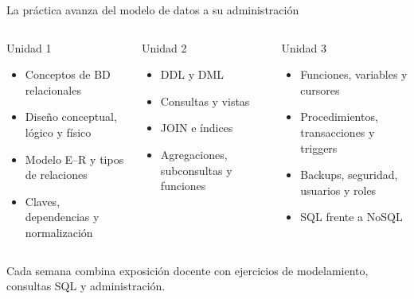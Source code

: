 \documentclass[aspectratio=169,10pt,c]{beamer}
\begin{document}
\begin{frame}{La práctica avanza del modelo de datos a su administración}
\begin{columns}[T,onlytextwidth]
\begin{block}{Unidad 1}
\footnotesize
\begin{itemize}\setlength\itemsep{2pt}
  \item Conceptos de BD relacionales
  \item Diseño conceptual, lógico y físico
  \item Modelo E--R y tipos de relaciones
  \item Claves, dependencias y normalización
\end{itemize}
\end{block}
\begin{exampleblock}{Unidad 2}
\footnotesize
\begin{itemize}\setlength\itemsep{2pt}
  \item DDL y DML
  \item Consultas y vistas
  \item JOIN e índices
  \item Agregaciones, subconsultas y funciones
\end{itemize}
\end{exampleblock}
\begin{alertblock}{Unidad 3}
\footnotesize
\begin{itemize}\setlength\itemsep{2pt}
  \item Funciones, variables y cursores
  \item Procedimientos, transacciones y triggers
  \item Backups, seguridad, usuarios y roles
  \item SQL frente a NoSQL
\end{itemize}
\end{alertblock}
\end{columns}
\vspace{0.2cm}
\small Cada semana combina exposición docente con ejercicios de modelamiento, consultas SQL y administración.
\end{frame}
\end{document}
